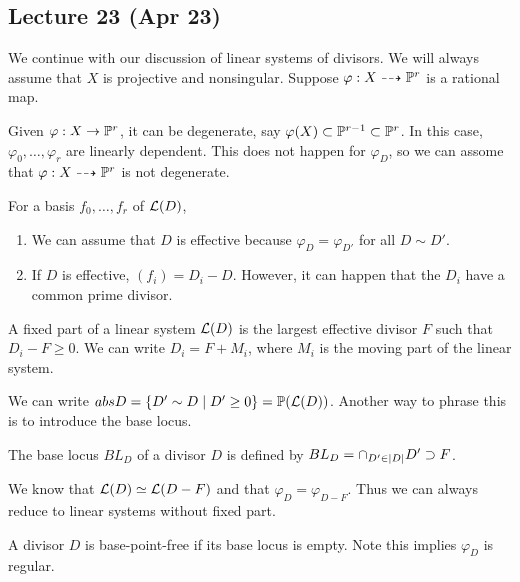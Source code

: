 \documentclass[twoside, 10pt]{article}
\begin{document}
        \subsection{Lecture 23 (Apr 23)}
        We continue with our discussion of linear systems of divisors. We will always assume that $X$ is projective and nonsingular. Suppose $\varphi:X \dashrightarrow \P^r$ is a rational map.

        \begin{rmk}
            Given $\varphi:X \to \P^r$, it can be degenerate, say $\varphi(X) \subset \P^{r-1} \subset \P^r$. In this case, $\varphi_0, \ldots, \varphi_r$ are linearly dependent. This does not happen for $\varphi_D$, so we can assome that $\varphi:X \dashrightarrow \P^r$ is not degenerate.
        \end{rmk}

        For a basis $f_0, \ldots, f_r$ of $\mc{L}(D)$,
        \begin{enumerate}
            \item We can assume that $D$ is effective because $\varphi_D = \varphi_{D'}$ for all $D \sim D'$.
            \item If $D$ is effective, $(f_i) = D_i - D$. However, it can happen that the $D_i$ have a common prime divisor.
        \end{enumerate}

        \begin{defn}
            A fixed part of a linear system $\mc{L}(D)$ is the largest effective divisor $F$ such that $D_i - F \geq 0$. We can write $D_i = F+M_i$, where $M_i$ is the moving part of the linear system.
        \end{defn}

        We can write $abs{D} = \{D' \sim D \mid D' \geq 0\} = \P(\mc{L}(D))$. Another way to phrase this is to introduce the base locus.

        \begin{defn}
            The base locus $BL_D$ of a divisor $D$ is defined by $BL_D = \cap_{D' \in \abs{D}} D' \supset F$. 
        \end{defn}
        
        We know that $\mc{L}(D) \simeq \mc{L}(D-F)$ and that $\varphi_D = \varphi_{D-F}$. Thus we can always reduce to linear systems without fixed part.

        \begin{defn}
            A divisor $D$ is base-point-free if its base locus is empty. Note this implies $\varphi_D$ is regular.
        \end{defn}
\end{document}
